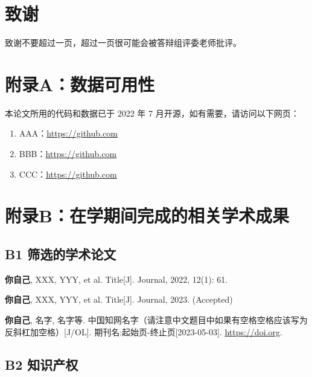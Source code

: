 \documentclass[14pt]{jnuthesis}
\begin{document}
\chapter*{致谢}

致谢不要超过一页，超过一页很可能会被答辩组评委老师批评。

\chapter*{附录A：数据可用性}

本论文所用的代码和数据已于 2022 年 7 月开源，如有需要，请访问以下网页：

\begin{enumerate}
	\item AAA：\url{https://github.com}
	\item BBB：\url{https://github.com}
	\item CCC：\url{https://github.com}
\end{enumerate}

\chapter*{附录B：在学期间完成的相关学术成果}

\section*{B1 筛选的学术论文}

\begin{enumerate}[{[}1{]}]
	\item \textbf{你自己}, XXX, YYY, et al. Title[J]. Journal, 2022, 12(1): 61. 
	\item \textbf{你自己}, XXX, YYY, et al. Title[J]. Journal, 2023. (Accepted)
	\item \textbf{你自己}, 名字, 名字等. 中国知网名字（请注意中文题目中如果有空格空格应该写为反斜杠加空格）[J/OL]. 期刊名:起始页-终止页[2023-05-03]. \url{https://doi.org}. %
\end{enumerate}

\section*{B2 知识产权}
\end{document}
